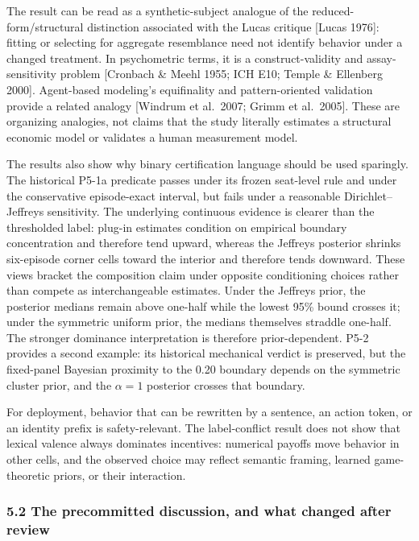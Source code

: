 \documentclass[
  11pt]{article}
\begin{document}
The result can be read as a synthetic-subject analogue of the
reduced-form/structural distinction associated with the Lucas critique
{[}Lucas 1976{]}: fitting or selecting for aggregate resemblance need
not identify behavior under a changed treatment. In psychometric terms,
it is a construct-validity and assay-sensitivity problem {[}Cronbach \&
Meehl 1955; ICH E10; Temple \& Ellenberg 2000{]}. Agent-based modeling's
equifinality and pattern-oriented validation provide a related analogy
{[}Windrum et al.~2007; Grimm et al.~2005{]}. These are organizing
analogies, not claims that the study literally estimates a structural
economic model or validates a human measurement model.

The results also show why binary certification language should be used
sparingly. The historical P5-1a predicate passes under its frozen
seat-level rule and under the conservative episode-exact interval, but
fails under a reasonable Dirichlet--Jeffreys sensitivity. The underlying
continuous evidence is clearer than the thresholded label: plug-in
estimates condition on empirical boundary concentration and therefore
tend upward, whereas the Jeffreys posterior shrinks six-episode corner
cells toward the interior and therefore tends downward. These views
bracket the composition claim under opposite conditioning choices rather
than compete as interchangeable estimates. Under the Jeffreys prior, the
posterior medians remain above one-half while the lowest 95\% bound
crosses it; under the symmetric uniform prior, the medians themselves
straddle one-half. The stronger dominance interpretation is therefore
prior-dependent. P5-2 provides a second example: its historical mechanical
verdict is preserved, but the fixed-panel Bayesian proximity to the 0.20
boundary depends on the symmetric cluster prior, and the $\alpha=1$
posterior crosses that boundary.

For deployment, behavior that can be rewritten by a sentence, an action
token, or an identity prefix is safety-relevant. The label-conflict
result does not show that lexical valence always dominates incentives:
numerical payoffs move behavior in other cells, and the observed choice
may reflect semantic framing, learned game-theoretic priors, or their
interaction.

\subsubsection{5.2 The precommitted discussion, and what changed after
review}\label{the-precommitted-discussion-and-what-changed-after-review}
\end{document}
